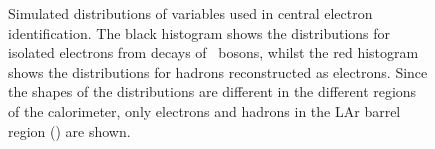 \begin{figure}[h]
\centering
\caption[Electron identification variables for electrons and hadrons with
]{Simulated distributions of variables used in central electron identification. The black
histogram shows the distributions for isolated electrons from decays of \Z\
bosons, whilst the red histogram shows the distributions for hadrons
reconstructed as electrons. Since the shapes of the distributions are different
in the different regions of the calorimeter, only electrons and hadrons in the
LAr barrel region (\modetalt{1.47}) are shown.}
\label{fig:el-id-showershapes-central}
\end{figure}

